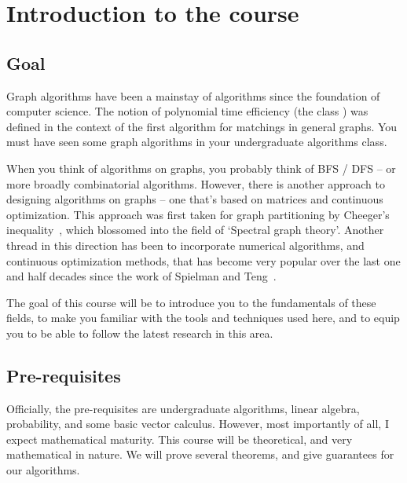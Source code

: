 \documentclass[11pt]{article}
\begin{document}
\newcommand{\coursenum}{{CSC 2421H}}
\newcommand{\coursename}{{Graphs, Matrices, and Optimization}}
\newcommand{\courseprof}{Sushant Sachdeva}


\section{Introduction to the course}

\subsection{Goal}
\label{sec:goal}

Graph algorithms have been a mainstay of algorithms since the
foundation of computer science. The notion of polynomial time
efficiency (the class \p) was defined in the context of the first
algorithm for matchings in general graphs. You must have seen some
graph algorithms in your undergraduate algorithms class.

When you think of algorithms on graphs, you probably think of BFS /
DFS -- or more broadly combinatorial algorithms. However, there is
another approach to designing algorithms on graphs -- one that's based
on matrices and continuous optimization. This approach was first taken
for graph partitioning by Cheeger's inequality~\cite{AlonM85}, which
blossomed into the field of `Spectral graph theory'. Another thread in
this direction has been to incorporate numerical algorithms, and
continuous optimization methods, that has become very popular over the
last one and half decades since the work of Spielman and
Teng~\cite{SpielmanT04}.

The goal of this course will be to introduce you to the fundamentals
of these fields, to make you familiar with the tools and techniques
used here, and to equip you to be able to follow the latest research
in this area.

\subsection{Pre-requisites}
Officially, the pre-requisites are undergraduate algorithms, linear
algebra, probability, and some basic vector calculus. However, most
importantly of all, I expect mathematical maturity. This course will
be theoretical, and very mathematical in nature. We will prove several
theorems, and give guarantees for our algorithms.
\end{document}
